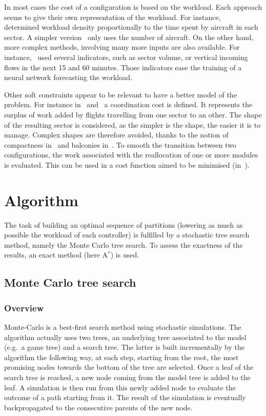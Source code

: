\documentclass[oneside,twocolumn]{article}
\begin{document}
In most cases the cost of a configuration is based on the workload. Each
approach seems to give their own representation of the workload. For instance,
~\cite{bedouet2016towards} determined workload density proportionally to the time
spent by aircraft in each sector. A simpler version~\cite{sergeeva2017dynamic}
only uses the number of aircraft. On the other hand, more complex methods,
involving many more inputs are also available. For
instance,~\cite{gianazza2010forecasting} used several indicators, such as sector
volume, or vertical incoming flows in the next 15 and 60 minutes. Those
indicators ease the training of a neural network forecasting the workload.

Other soft constraints appear to be relevant to have a better model of
the problem. For instance in~\cite{sergeeva2017dynamic}
and~\cite{bedouet2016towards} a
coordination cost is defined. It represents the surplus of work added by
flights travelling from one sector to an other. The shape of the
resulting sector is considered, as the simpler is
the shape, the easier it is to manage. Complex shapes are therefore avoided,
thanks to the notion of compactness in~\cite{jagare2013airspace} and balconies
in~\cite{sergeeva2017dynamic}. To smooth the transition between two
configurations, the work associated with the reallocation of one or more modules
is evaluated. This can be used in a cost function aimed to be minimised
(in~\cite{bedouet2016towards}).

\section{Algorithm}

The task of building an optimal sequence of partitions (lowering
as much as possible the workload of each controller) is fulfilled by a
stochastic tree search method, namely the Monte Carlo tree search. To assess the
exactness of the results, an exact method (here A\(^*\)) is used.

\subsection{Monte Carlo tree search}
\subsubsection{Overview}
Monte-Carlo is a best-first search method using stochastic simulations. The
algorithm actually uses two trees, an underlying tree associated to the model
(e.g.\ a game tree) and a search tree. The latter is built incrementally by the
algorithm the following way, at each step, starting from the root, the most
promising nodes towards the bottom of the tree are selected. Once a leaf of the
search tree is reached, a new node coming from the model tree is added to the
leaf. A simulation is then run from this newly added node to evaluate the
outcome of a path starting from it. The result of the simulation is eventually
backpropagated to the consecutive parents of the new node.
\end{document}
